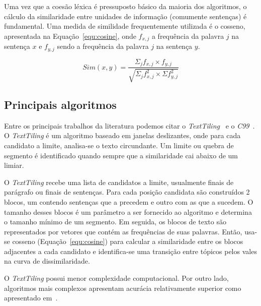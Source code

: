 
Uma vez que a coesão léxica é pressuposto básico da maioria dos algoritmos, o cálculo da similaridade entre unidades de informação (comumente sentenças) é fundamental. Uma medida de similidade frequentemente utilizada é o cosseno, apresentada na Equação~\ref{equ:cosine}, onde $f_{x,j}$ a frequência da palavra $j$ na sentença $x$ e $f_{y,j}$ sendo a frequência da palavra $j$ na sentença $y$.


\begin{equation}
Sim(x,y) = \frac
{\Sigma_j f_{x,j} \times f_{y,j}}
{\sqrt{\Sigma_j f^2_{x,j} \times \Sigma f^2_{y,j}}}
\label{equ:cosine}
\end{equation}


\subsection{Principais algoritmos}
	\label{subsec:principaisalgoritimos}

Entre os principais trabalhos da literatura podemos citar o  \textit{TextTiling}~\cite{Hearst1994} e o \textit{C99}~\cite{Choi2000}.
%
O \textit{TextTiling} é um algoritmo baseado em janelas deslizantes, onde para cada candidato a limite, analisa-se o texto circundante. Um limite ou quebra de segmento é identificado quando sempre que a similaridade cai abaixo de um limiar.


O \textit{TextTiling} recebe uma lista de candidatos a limite, usualmente finais de parágrafo ou finais de sentenças. Para cada posição candidata são construídos 2 blocos, um contendo sentenças que a precedem e outro com as que a sucedem. O tamanho desses blocos é um parâmetro a ser fornecido ao algoritmo e determina o tamanho mínimo de um segmento.
%
Em seguida, os blocos de texto são representados por vetores que contém as frequências de suas palavras. Então, usa-se cosseno (Equação~\ref{equ:cosine}) para calcular a similaridade entre os blocos adjacentes a cada candidato e identifica-se uma transição entre tópicos pelos vales na curva de dissimilaridade.



O \textit{TextTiling} possui menor complexidade computacional. Por outro lado, algoritmos mais complexos apresentam acurácia relativamente superior como apresentado em~\cite{Choi2000, Kern2009, Misra2009}.





